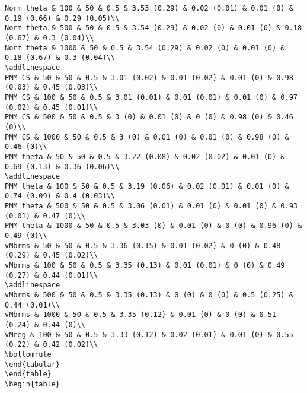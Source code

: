 \documentclass[
]{article}
\begin{document}
\begin{verbatim}
Norm theta & 100 & 50 & 0.5 & 3.53 (0.29) & 0.02 (0.01) & 0.01 (0) & 0.19 (0.66) & 0.29 (0.05)\\
Norm theta & 500 & 50 & 0.5 & 3.54 (0.29) & 0.02 (0) & 0.01 (0) & 0.18 (0.67) & 0.3 (0.04)\\
Norm theta & 1000 & 50 & 0.5 & 3.54 (0.29) & 0.02 (0) & 0.01 (0) & 0.18 (0.67) & 0.3 (0.04)\\
\addlinespace
PMM CS & 50 & 50 & 0.5 & 3.01 (0.02) & 0.01 (0.02) & 0.01 (0) & 0.98 (0.03) & 0.45 (0.03)\\
PMM CS & 100 & 50 & 0.5 & 3.01 (0.01) & 0.01 (0.01) & 0.01 (0) & 0.97 (0.02) & 0.45 (0.01)\\
PMM CS & 500 & 50 & 0.5 & 3 (0) & 0.01 (0) & 0 (0) & 0.98 (0) & 0.46 (0)\\
PMM CS & 1000 & 50 & 0.5 & 3 (0) & 0.01 (0) & 0.01 (0) & 0.98 (0) & 0.46 (0)\\
PMM theta & 50 & 50 & 0.5 & 3.22 (0.08) & 0.02 (0.02) & 0.01 (0) & 0.69 (0.13) & 0.36 (0.06)\\
\addlinespace
PMM theta & 100 & 50 & 0.5 & 3.19 (0.06) & 0.02 (0.01) & 0.01 (0) & 0.74 (0.09) & 0.4 (0.03)\\
PMM theta & 500 & 50 & 0.5 & 3.06 (0.01) & 0.01 (0) & 0.01 (0) & 0.93 (0.01) & 0.47 (0)\\
PMM theta & 1000 & 50 & 0.5 & 3.03 (0) & 0.01 (0) & 0 (0) & 0.96 (0) & 0.49 (0)\\
vMbrms & 50 & 50 & 0.5 & 3.36 (0.15) & 0.01 (0.02) & 0 (0) & 0.48 (0.29) & 0.45 (0.02)\\
vMbrms & 100 & 50 & 0.5 & 3.35 (0.13) & 0.01 (0.01) & 0 (0) & 0.49 (0.27) & 0.44 (0.01)\\
\addlinespace
vMbrms & 500 & 50 & 0.5 & 3.35 (0.13) & 0 (0) & 0 (0) & 0.5 (0.25) & 0.44 (0.01)\\
vMbrms & 1000 & 50 & 0.5 & 3.35 (0.12) & 0.01 (0) & 0 (0) & 0.51 (0.24) & 0.44 (0)\\
vMreg & 100 & 50 & 0.5 & 3.33 (0.12) & 0.02 (0.01) & 0.01 (0) & 0.55 (0.22) & 0.42 (0.02)\\
\bottomrule
\end{tabular}
\end{table}
\begin{table}


\end{verbatim}
\end{document}
